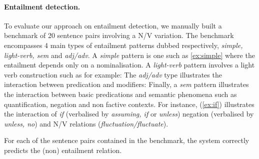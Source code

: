 \documentclass[twocolumn,10pt]{article}
\begin{document}
\paragraph{Entailment detection.} 
To evaluate our approach on entailment detection, we manually built a
benchmark of 20 sentence pairs involving a N/V variation.  The
benchmark encompasses 4 main types of entailment patterns dubbed
respectively, {\it simple, light-verb, sem} and {\it
  adj/adv}. A {\it simple} pattern is one such as
\ref{ex:simple} where the entailment depends only on a nominalisation.
A {\it light-verb} pattern involves a light verb construction such as for example:
 The {\it adj/adv} type
illustrates the interaction between predication and modifiers:
Finally, a {\it sem} pattern illustrates the interaction between basic
predications and semantic phenomena such as quantification, negation
and non factive contexts. For instance, (\ref{ex:if}) illustrates the
interaction of {\it if} (verbalised by {\it assuming, if} or {\it
  unless}) negation (verbalised by {\it unless, no}) and N/V relations
({\it fluctuation/fluctuate}).

For each of the sentence pairs contained in the benchmark, the system correctly predicts the (non) entailment relation. 
\end{document}
